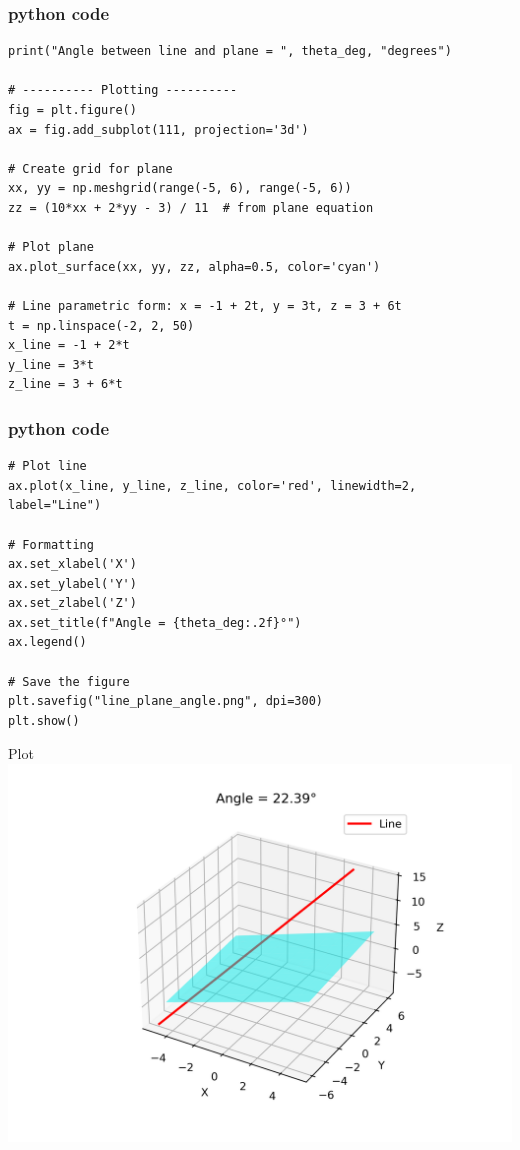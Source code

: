 \documentclass{beamer}
\begin{document}
\begin{frame}[fragile]
    \frametitle{python code }
    \begin{lstlisting}
print("Angle between line and plane = ", theta_deg, "degrees")

# ---------- Plotting ----------
fig = plt.figure()
ax = fig.add_subplot(111, projection='3d')

# Create grid for plane
xx, yy = np.meshgrid(range(-5, 6), range(-5, 6))
zz = (10*xx + 2*yy - 3) / 11  # from plane equation

# Plot plane
ax.plot_surface(xx, yy, zz, alpha=0.5, color='cyan')

# Line parametric form: x = -1 + 2t, y = 3t, z = 3 + 6t
t = np.linspace(-2, 2, 50)
x_line = -1 + 2*t
y_line = 3*t
z_line = 3 + 6*t

\end{lstlisting}
\end{frame}
\begin{frame}[fragile]
    \frametitle{python code }
    \begin{lstlisting}
# Plot line
ax.plot(x_line, y_line, z_line, color='red', linewidth=2, label="Line")

# Formatting
ax.set_xlabel('X')
ax.set_ylabel('Y')
ax.set_zlabel('Z')
ax.set_title(f"Angle = {theta_deg:.2f}°")
ax.legend()

# Save the figure
plt.savefig("line_plane_angle.png", dpi=300)
plt.show()
    \end{lstlisting}
\end{frame}
\begin{frame}{Plot}
    \centering
    \includegraphics[width=\columnwidth, height=0.8\textheight, keepaspectratio]{figs/line_plane_angle.png}     
\end{frame}
\end{document}
